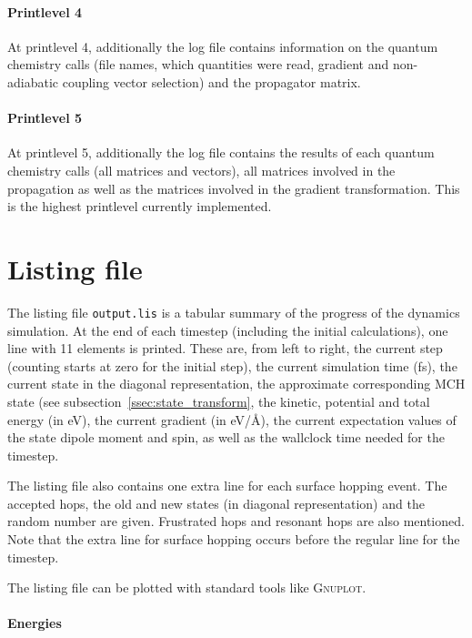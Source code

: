 \documentclass[a4paper,11pt,DIV=15,openany,twoside=false]{scrbook}
\newcommand{\ttt}[1]{\texttt{#1}}
\begin{document}
\paragraph{Printlevel 4}

At printlevel 4, additionally the log file contains information on the quantum chemistry calls (file names, which quantities were read, gradient and non-adiabatic coupling vector selection) and the propagator matrix.

\paragraph{Printlevel 5}

At printlevel 5, additionally the log file contains the results of each quantum chemistry calls (all matrices and vectors), all matrices involved in the propagation as well as the matrices involved in the gradient transformation. This is the highest printlevel currently implemented.

\section{Listing file}\label{sec:lisfile}

The listing file \ttt{output.lis} is a tabular summary of the progress of the dynamics simulation. At the end of each timestep (including the initial calculations), one line with 11 elements is printed. These are, from left to right, the current step (counting starts at zero for the initial step), the current simulation time (fs), the current state in the diagonal representation, the approximate corresponding MCH state (see subsection~\ref{ssec:state_transform}, the kinetic, potential and total energy (in eV), the current gradient (in eV/\AA), the current expectation values of the state dipole moment and spin, as well as the wallclock time needed for the timestep.

The listing file also contains one extra line for each surface hopping event. The accepted hops, the old and new states (in diagonal representation) and the random number are given. Frustrated hops and resonant hops are also mentioned. Note that the extra line for surface hopping occurs before the regular line for the timestep. 

The listing file can be plotted with standard tools like \textsc{Gnuplot}. 

\paragraph{Energies}
\end{document}
